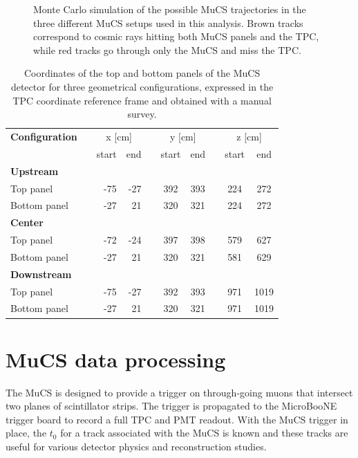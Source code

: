 \documentclass[a4paper]{scrartcl}
\begin{document}
\begin{figure}[htbp]
  \caption{Monte Carlo simulation of the possible MuCS trajectories in the three different MuCS setups used in this analysis. Brown tracks correspond to cosmic rays hitting both MuCS panels and the TPC, while red tracks go through only the MuCS and miss the TPC.} \label{fig:mucs}
\end{figure}

\begin{table}[htbp]
  \centering
  \begin{tabular}{lcrrrccccc}
    \toprule
    \textbf{Configuration} & \phantom{abc}& \multicolumn{2}{c}{x [cm]} & \phantom{abc} & \multicolumn{2}{c}{y [cm]} & \phantom{abc} & \multicolumn{2}{c}{z [cm]}\\
    \cmidrule{3-4} \cmidrule{6-7} \cmidrule{9-10}
    & & start & end & & start & end & & start & end\\
    \midrule

    \textbf{Upstream} & & & & & & & & & \\
    Top panel & & -75 & -27 & & 392 & 393 & & 224 & 272\\
    Bottom panel & & -27 & 21 & & 320 & 321 & & 224 & 272\\

    \midrule
    \textbf{Center} & & & & & & & & & \\
    Top panel & & -72 & -24 & & 397 & 398 & & 579 & 627\\
    Bottom panel & & -27 & 21 & & 320 & 321 & & 581 & 629\\
    \midrule
    \textbf{Downstream} & & & & & & & & & \\
    Top panel & & -75 & -27 & & 392 & 393 & & 971 & 1019\\
    Bottom panel & & -27 & 21 & & 320 & 321 & & 971 & 1019\\
    \bottomrule

  \end{tabular}
  \caption{Coordinates of the top and bottom panels of the MuCS detector for three geometrical configurations, expressed in the TPC coordinate reference frame and obtained with a manual survey.}\label{tab:mucs}
\end{table}


\section{MuCS data processing}\label{sec:merging}
The MuCS is designed to provide a trigger on through-going muons that intersect two planes of scintillator strips. The trigger is propagated to the MicroBooNE trigger board to record a full TPC and PMT readout. With the MuCS trigger in place, the $t_0$ for a track associated with the MuCS is known and these tracks are useful for various detector physics and reconstruction studies.
\end{document}
